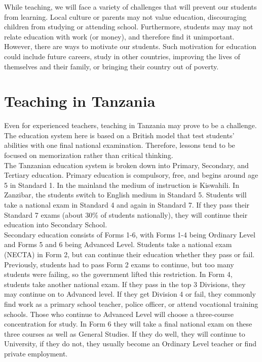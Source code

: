 While teaching, we will face a variety of challenges that will prevent our students from learning.  Local culture or parents may not value education, discouraging children from studying or attending school.  Furthermore, students may may not relate education with work (or money), and therefore find it unimportant.  However, there are ways to motivate our students.  Such motivation for education could include future careers, study in other countries, improving the lives of themselves and their family, or bringing their country out of poverty.  

\section{Teaching in Tanzania}
Even for experienced teachers, teaching in Tanzania may prove to be a challenge.  The education system here is based on a British model that test students' abilities with one final national examination.  Therefore, lessons tend to be focused on memorization rather than critical thinking.\\

The Tanzanian education system is broken down into Primary, Secondary, and Tertiary education.  Primary education is compulsory, free, and begins around age 5 in Standard 1. In the mainland the medium of instruction is Kiswahili.  In Zanzibar, the students switch to English medium in Standard 5. Students will take a national exam in Standard 4 and again in Standard 7.  If they pass their Standard 7 exams (about 30\% of students nationally), they will continue their education into Secondary School.  \\

Secondary education consists of Forms 1-6, with Forms 1-4 being Ordinary Level and Forms 5 and 6 being Advanced Level.  Students take a national exam (NECTA) in Form 2, but can continue their education whether they pass or fail.  Previously, students had to pass Form 2 exams to continue, but too many students were failing, so the government lifted this restriction.  In Form 4, students take another national exam.  If they pass in the top 3 Divisions, they may continue on to Advanced level.  If they get Division 4 or fail, they commonly find work as a primary school teacher, police officer, or attend vocational training schools.   Those who continue to Advanced Level will choose a three-course concentration for study.  In Form 6 they will take a final national exam on these three courses as well as General Studies.  If they do well, they will continue to University, if they do not, they usually become an Ordinary Level teacher or find private employment.\\

